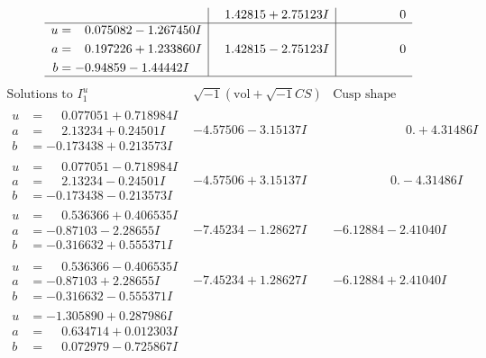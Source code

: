 \documentclass[1p]{elsarticle_modified}
\theoremstyle{definition}
\newcommand{\I}{\sqrt{-1}}
\begin{document}
$$\begin{array}{c|c|c}
 & \phantom{-}1.42815 + 2.75123 I & \phantom{-0.000000 } 0 \\ \hline\begin{aligned}
u &= \phantom{-}0.075082 - 1.267450 I \\
a &= \phantom{-}0.197226 + 1.233860 I \\
b &= -0.94859 - 1.44442 I\end{aligned}
 & \phantom{-}1.42815 - 2.75123 I & \phantom{-0.000000 } 0\\
 \hline 
 \end{array}$$\newpage$$\begin{array}{c|c|c}  
\text{Solutions to }I^u_{1}& \I (\text{vol} + \sqrt{-1}CS) & \text{Cusp shape}\\
 \hline 
\begin{aligned}
u &= \phantom{-}0.077051 + 0.718984 I \\
a &= \phantom{-}2.13234 + 0.24501 I \\
b &= -0.173438 + 0.213573 I\end{aligned}
 & -4.57506 - 3.15137 I & \phantom{-0.000000 -}0. + 4.31486 I \\ \hline\begin{aligned}
u &= \phantom{-}0.077051 - 0.718984 I \\
a &= \phantom{-}2.13234 - 0.24501 I \\
b &= -0.173438 - 0.213573 I\end{aligned}
 & -4.57506 + 3.15137 I & \phantom{-0.000000 } 0. - 4.31486 I \\ \hline\begin{aligned}
u &= \phantom{-}0.536366 + 0.406535 I \\
a &= -0.87103 - 2.28655 I \\
b &= -0.316632 + 0.555371 I\end{aligned}
 & -7.45234 - 1.28627 I & -6.12884 - 2.41040 I \\ \hline\begin{aligned}
u &= \phantom{-}0.536366 - 0.406535 I \\
a &= -0.87103 + 2.28655 I \\
b &= -0.316632 - 0.555371 I\end{aligned}
 & -7.45234 + 1.28627 I & -6.12884 + 2.41040 I \\ \hline\begin{aligned}
u &= -1.305890 + 0.287986 I \\
a &= \phantom{-}0.634714 + 0.012303 I \\
b &= \phantom{-}0.072979 - 0.725867 I\end{aligned}

\end{array}$$
\end{document}
